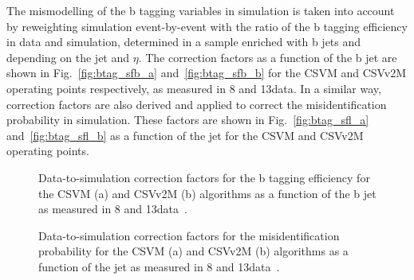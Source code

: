 The mismodelling of the b tagging variables in simulation is taken into account by reweighting simulation event-by-event with the ratio of the b tagging efficiency in data and simulation, determined in a sample enriched with b jets and depending on the jet \pt and $\eta$. The correction factors as a function of the b jet \pt  are shown in Fig.~\ref{fig:btag_sfb_a} and~\ref{fig:btag_sfb_b} for the CSVM and CSVv2M operating points respectively, as measured in 8 and 13\TeV data. In a similar way, correction factors are also derived and applied to correct the misidentification probability in simulation. These factors are shown in Fig.~\ref{fig:btag_sfl_a} and~\ref{fig:btag_sfl_b} as a function of the jet \pt for the CSVM and CSVv2M operating points.

\begin{figure}[!htb]
\begin{center}
\end{center} 
\caption{Data-to-simulation correction factors for the b tagging efficiency for the CSVM (a) and CSVv2M (b) algorithms as a function of the b jet \pt as measured in 8 and 13\TeV data~\cite{CMS:BTV13001,CMS-PAS-BTV-15-001}.}
\label{fig:btag_sfb}
\end{figure}

\begin{figure}[!htb]
\begin{center}
\end{center} 
\caption{Data-to-simulation correction factors for the misidentification probability for the CSVM (a) and CSVv2M (b) algorithms as a function of the jet \pt as measured in 8 and 13\TeV data~\cite{CMS:BTV13001,CMS-PAS-BTV-15-001}.}
\label{fig:btag_sfl}
\end{figure}